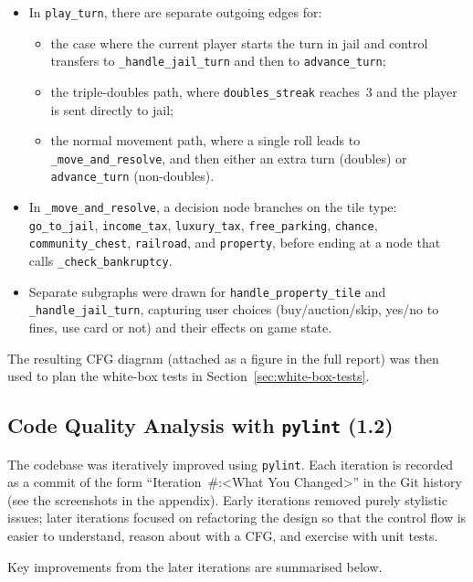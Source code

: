 \documentclass[11pt]{article}
\begin{document}
\begin{itemize}
  \item In \texttt{play\_turn}, there are separate outgoing edges for:
  \begin{itemize}
    \item the case where the current player starts the turn in jail and control transfers to \texttt{\_handle\_jail\_turn} and then to \texttt{advance\_turn};
    \item the triple-doubles path, where \texttt{doubles\_streak} reaches~3 and the player is sent directly to jail;
    \item the normal movement path, where a single roll leads to \texttt{\_move\_and\_resolve}, and then either an extra turn (doubles) or \texttt{advance\_turn} (non-doubles).
  \end{itemize}
  \item In \texttt{\_move\_and\_resolve}, a decision node branches on the tile type: \texttt{go\_to\_jail}, \texttt{income\_tax}, \texttt{luxury\_tax}, \texttt{free\_parking}, \texttt{chance}, \texttt{community\_chest}, \texttt{railroad}, and \texttt{property}, before ending at a node that calls \texttt{\_check\_bankruptcy}.
  \item Separate subgraphs were drawn for \texttt{handle\_property\_tile} and \texttt{\_handle\_jail\_turn}, capturing user choices (buy/auction/skip, yes/no to fines, use card or not) and their effects on game state.
\end{itemize}

The resulting CFG diagram (attached as a figure in the full report) was then used to plan the white-box tests in Section~\ref{sec:white-box-tests}.

\subsection{Code Quality Analysis with \texttt{pylint} (1.2)}

\label{sec:code-quality}

The codebase was iteratively improved using \texttt{pylint}. Each iteration is recorded as a commit of the form ``Iteration~\#:\textless{}What You Changed\textgreater{}'' in the Git history (see the screenshots in the appendix). Early iterations removed purely stylistic issues; later iterations focused on refactoring the design so that the control flow is easier to understand, reason about with a CFG, and exercise with unit tests.

Key improvements from the later iterations are summarised below.
\end{document}
